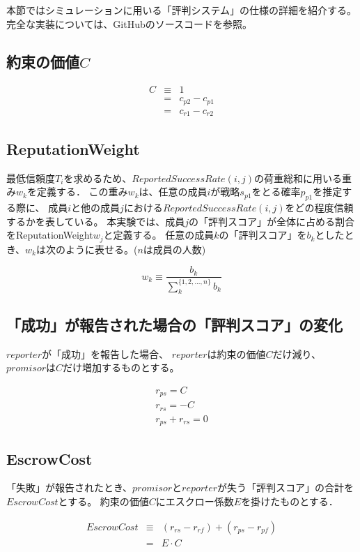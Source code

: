 本節ではシミュレーションに用いる「評判システム」の仕様の詳細を紹介する。
完全な実装については、GitHubのソースコードを参照。

\subsection{約束の価値$C$}
\begin{eqnarray}
  C &\equiv& 1 \\
    &=& c_{p2} - c_{p1} \\
    &=& c_{r1} - c_{r2}
\end{eqnarray}

\subsection{ReputationWeight}
最低信頼度$ T_i $を求めるため、$ReportedSuccessRate(i, j)$の荷重総和に用いる重み$ w_k $を定義する．
この重み$w_k$は、任意の成員$i$が戦略$s_{p1}$をとる確率$p_{p1}$を推定する際に、
成員$i$と他の成員$j$における$ReportedSuccessRate(i, j)$をどの程度信頼するかを表している。
本実験では、成員$j$の「評判スコア」が全体に占める割合をReputationWeight$w_j$と定義する。
任意の成員$k$の「評判スコア」を$b_k$としたとき、$w_k$は次のように表せる。($n$は成員の人数)

\begin{equation*}
  w_k \equiv \frac{b_k}{\sum^{\{1,2,...,n\}}_{k}b_k}
\end{equation*}

\subsection{「成功」が報告された場合の「評判スコア」の変化}
$ reporter $が「成功」を報告した場合、
$ reporter $は約束の価値$C$だけ減り、$ promisor $は$C$だけ増加するものとする。

\begin{gather}
  r_{ps} = C \\
  r_{rs} = -C \\
  r_{ps} + r_{rs} = 0
\end{gather}


\subsection{EscrowCost}
「失敗」が報告されたとき、$promisor$と$reporter$が失う「評判スコア」の合計を$EscrowCost$とする。
約束の価値$C$にエスクロー係数$E$を掛けたものとする．

\begin{eqnarray}
  EscrowCost  &\equiv& (r_{rs} - r_{rf}) + (r_{ps} - r_{pf}) \\
              &=& E \cdot C \label{escrowCost}
\end{eqnarray}

